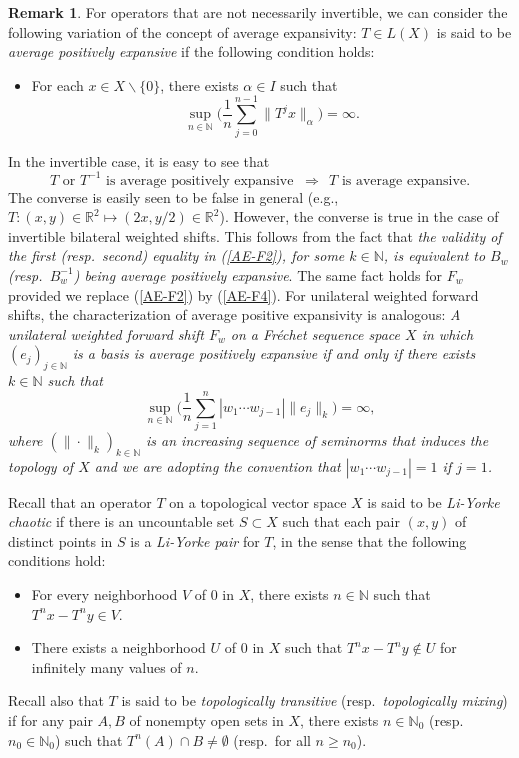 \documentclass[12pt]{amsart}
\theoremstyle{theorem}
\theoremstyle{definition}
\newtheorem{remark}[theorem]{Remark}
\theoremstyle{remark} \theoremstyle{question} \theoremstyle{example}
\newcommand{\N}{\mathbb{N}}   %
\newcommand{\R}{\mathbb{R}}   %
\begin{document}
\begin{remark}\label{AE-R2}
For operators that are not necessarily invertible, we can consider the following variation of the concept of average expansivity:
$T \in L(X)$ is said to be {\em average positively expansive} if the following condition holds:
\begin{itemize}
\item [(APE)] For each $x \in X \backslash \{0\}$, there exists $\alpha \in I$ such that
\[
\sup_{n \in \N} \Big(\frac{1}{n} \sum_{j=0}^{n-1} \|T^j x\|_\alpha \Big) = \infty.
\]
\end{itemize}
In the invertible case, it is easy to see that
\[
T \text{ or } T^{-1} \text{ is average positively expansive } \ \Longrightarrow \ \ T \text{ is average expansive}.
\]
The converse is easily seen to be false in general (e.g., $T : (x,y) \in \R^2 \mapsto (2x,y/2) \in \R^2$).
However, the converse is true in the case of invertible bilateral weighted shifts.
This follows from the fact that {\it the validity of the first (resp.\ second) equality in (\ref{AE-F2}), for some $k \in \N$,
is equivalent to $B_w$ (resp.\ $B_w^{-1}$) being average positively expansive}.
The same fact holds for $F_w$ provided we replace (\ref{AE-F2}) by (\ref{AE-F4}).
For unilateral weighted forward shifts, the characterization of average positive expansivity is analogous:
{\it A unilateral weighted forward shift $F_w$ on a Fr\'echet sequence space $X$ in which $(e_j)_{j \in \N}$ is a basis
is average positively expansive if and only if there exists $k \in \N$ such that
\[
\sup_{n \in \N} \Big(\frac{1}{n} \sum_{j=1}^n |w_1 \cdots w_{j-1}| \|e_j\|_k\Big) = \infty,
\]
where $(\|\cdot\|_k)_{k \in \N}$ is an increasing sequence of seminorms that induces the topology of $X$
and we are adopting the convention that $|w_1 \cdots w_{j-1}| = 1$ if $j = 1$.}
\end{remark}

Recall \cite{BCDFP} that an operator $T$ on a topological vector space $X$ is said to be {\em Li-Yorke chaotic}
if there is an uncountable set $S \subset X$ such that each pair $(x,y)$ of distinct points in $S$ is a {\em Li-Yorke pair} for $T$,
in the sense that the following conditions hold:
\begin{itemize}
\item [(LY1)] For every neighborhood $V$ of $0$ in $X$, there exists $n \in \N$ such that $T^nx - T^ny \in V$.
\item [(LY2)] There exists a neighborhood $U$ of $0$ in $X$ such that $T^nx - T^ny \not\in U$ for infinitely many values of $n$.
\end{itemize}
Recall also that $T$ is said to be {\em topologically transitive} (resp.\ {\em topologically mixing}) if 
for any pair $A,B$ of nonempty open sets in $X$, there exists $n \in \N_0$ (resp.\ $n_0 \in \N_0$) such that
$T^n(A) \cap B \neq \emptyset$ (resp.\ for all $n \geq n_0$).
\end{document}
